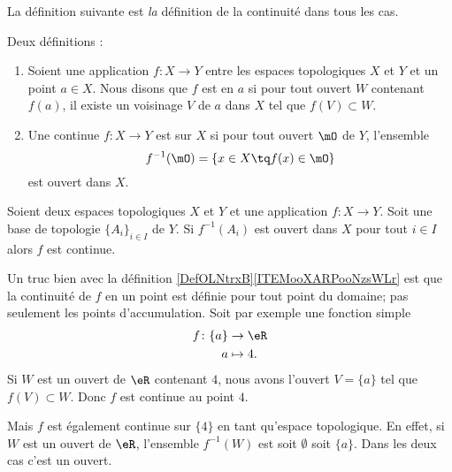 La définition suivante est \emph{la} définition de la continuité dans tous les cas.
\begin{definition}\label{DefOLNtrxB}
	Deux définitions :
	\begin{enumerate}
		\item   \label{ITEMooXARPooNzsWLr}
		      Soient une application \( f\colon X\to Y\) entre les espaces topologiques \( X\) et \( Y\) et un point \( a\in X\). Nous disons que \( f\) est  en \( a\) si pour tout ouvert \( W\) contenant \( f(a)\), il existe un voisinage \( V\) de \( a\) dans \( X\) tel que \( f(V)\subset W\).
		\item       \label{ITEMooEHGWooDdITRV}
		      Une continue \( f\colon X\to Y\) est  sur \( X\) si pour tout ouvert \( \mO\) de \( Y\), l'ensemble
		      \begin{equation}      \label{defFminus1ofaset}
			      f^{-1}(\mO) = \{ x \in X \tq f(x) \in \mO\}
		      \end{equation}
		      est ouvert dans \( X\).
	\end{enumerate}
\end{definition}

\begin{lemma}       \label{LEMooYTLSooKhetml}
    Soient deux espaces topologiques \( X\) et \( Y\) et une application \( f\colon X\to Y\). Soit une base de topologie \( \{ A_i \}_{i\in I}\) de \( Y\). Si \( f^{-1}(A_i) \) est ouvert dans \( X\) pour tout \( i\in I\) alors \( f\) est continue.
\end{lemma}

\begin{example}
	Un truc bien avec la définition \ref{DefOLNtrxB}\ref{ITEMooXARPooNzsWLr} est que la continuité de \( f\) en un point est définie pour tout point du domaine; pas seulement les points d'accumulation. Soit par exemple une fonction simple
	\begin{equation}
		\begin{aligned}
			f\colon \{a\} & \to \eR    \\
			a             & \mapsto 4.
		\end{aligned}
	\end{equation}
	Si \( W\) est un ouvert de \( \eR\) contenant \( 4\), nous avons l'ouvert \( V=\{a\}\) tel que \( f(V)\subset W\). Donc \( f\) est continue au point \( 4\).

	Mais \( f\) est également continue sur \( \{4\}\) en tant qu'espace topologique. En effet, si \( W\) est un ouvert de \( \eR\), l'ensemble \( f^{-1}(W)\) est soit \( \emptyset\) soit \( \{a\}\). Dans les deux cas c'est un ouvert.
\end{example}

